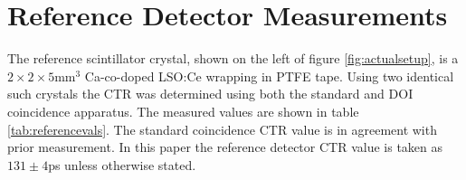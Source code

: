 \section{Reference Detector Measurements}
The reference scintillator crystal, shown on the left of figure \ref{fig:actualsetup}, is a $2\times2\times5$mm$^3$ Ca-co-doped LSO:Ce wrapping in PTFE tape. Using two identical such crystals the CTR was determined using both the standard and DOI coincidence apparatus. The measured values are shown in table \ref{tab:referencevals}. The standard coincidence CTR value is in agreement with prior measurement\cite{arron_Meyer_Pauwels_Lecoq_2012}. In this paper the reference detector CTR value is taken as $131\pm4$ps unless otherwise stated.